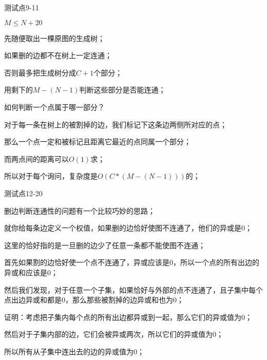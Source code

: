 \documentclass{beamer}
\begin{document}
\begin{frame}{测试点9-11}

	\par $M \leq N + 20$

	\pause

	\par 先随便取出一棵原图的生成树；

	\par 如果删的边都不在树上一定连通；

	\pause

	\par 否则最多把生成树分成$C + 1$个部分；

	\par 用剩下的$M - (N - 1)$判断这些部分是否能连通；

	\pause

	\par 如何判断一个点属于哪一部分？

	\pause

	\par 对于每一条在树上的被割掉的边，我们标记下这条边两侧所对应的点；

	\par 那么一个点一定和被标记且距离它最近的点同属一个部分；

	\pause

	\par 而两点间的距离可以$O(1)$求；

	\par 所以对于每个询问，复杂度是$O(C * (M - (N - 1)))$的；

\end{frame}

\begin{frame}{测试点12-20}

	\par 删边判断连通性的问题有一个比较巧妙的思路；

	\pause

	\par 就你给每条边定义一个权值，如果删的边恰好使图不连通了，他们的异或是0；

	\par 这里的恰好指的是一旦删的边少了任意一条都不能使图不连通；

	\pause

	\par 首先如果割的边恰好使一个点不连通了，异或应该是0，所以一个点的所有出边的异或和应该是0；

	\pause

	\par 然后我们发现，对于任意一个子集，如果恰好与外部的点不连通了，且子集中每个点出边异或和都是0，那么那些被割掉的边异或和也为0；

	\pause

	\par 证明：考虑把子集内每个点的所有出边都异或到一起，那么它们的异或值为0；

	\par 然后对于子集内部的边，它们会被异或两次，所以它们的异或值为0；

	\par 所以所有从子集中连出去的边的异或值为0；

\end{frame}
\end{document}
